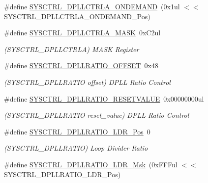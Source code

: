 \begin{DoxyCompactItemize}
\#define \mbox{\hyperlink{group___s_a_m_d21___s_y_s_c_t_r_l_ga69e7047499b6974d553e5ac3e7d472b6}{S\+Y\+S\+C\+T\+R\+L\+\_\+\+D\+P\+L\+L\+C\+T\+R\+L\+A\+\_\+\+O\+N\+D\+E\+M\+A\+ND}}~(0x1ul $<$$<$ S\+Y\+S\+C\+T\+R\+L\+\_\+\+D\+P\+L\+L\+C\+T\+R\+L\+A\+\_\+\+O\+N\+D\+E\+M\+A\+N\+D\+\_\+\+Pos)
\item 
\#define \mbox{\hyperlink{group___s_a_m_d21___s_y_s_c_t_r_l_ga7759bc930961d17fb6a1c8d53d9b4d33}{S\+Y\+S\+C\+T\+R\+L\+\_\+\+D\+P\+L\+L\+C\+T\+R\+L\+A\+\_\+\+M\+A\+SK}}~0x\+C2ul
\begin{DoxyCompactList}\small\item\em (S\+Y\+S\+C\+T\+R\+L\+\_\+\+D\+P\+L\+L\+C\+T\+R\+LA) M\+A\+SK Register \end{DoxyCompactList}\item 
\#define \mbox{\hyperlink{group___s_a_m_d21___s_y_s_c_t_r_l_ga8d2f342a1b224ae5cf0fa357d49c3ed1}{S\+Y\+S\+C\+T\+R\+L\+\_\+\+D\+P\+L\+L\+R\+A\+T\+I\+O\+\_\+\+O\+F\+F\+S\+ET}}~0x48
\begin{DoxyCompactList}\small\item\em (S\+Y\+S\+C\+T\+R\+L\+\_\+\+D\+P\+L\+L\+R\+A\+T\+IO offset) D\+P\+LL Ratio Control \end{DoxyCompactList}\item 
\#define \mbox{\hyperlink{group___s_a_m_d21___s_y_s_c_t_r_l_gaee8c7eb057abe248c8312abfaa82a124}{S\+Y\+S\+C\+T\+R\+L\+\_\+\+D\+P\+L\+L\+R\+A\+T\+I\+O\+\_\+\+R\+E\+S\+E\+T\+V\+A\+L\+UE}}~0x00000000ul
\begin{DoxyCompactList}\small\item\em (S\+Y\+S\+C\+T\+R\+L\+\_\+\+D\+P\+L\+L\+R\+A\+T\+IO reset\+\_\+value) D\+P\+LL Ratio Control \end{DoxyCompactList}\item 
\#define \mbox{\hyperlink{group___s_a_m_d21___s_y_s_c_t_r_l_gab84b0699148696285e95394ae4624f7a}{S\+Y\+S\+C\+T\+R\+L\+\_\+\+D\+P\+L\+L\+R\+A\+T\+I\+O\+\_\+\+L\+D\+R\+\_\+\+Pos}}~0
\begin{DoxyCompactList}\small\item\em (S\+Y\+S\+C\+T\+R\+L\+\_\+\+D\+P\+L\+L\+R\+A\+T\+IO) Loop Divider Ratio \end{DoxyCompactList}\item 
\#define \mbox{\hyperlink{group___s_a_m_d21___s_y_s_c_t_r_l_ga3c5e034ed9b9a16884741f783e1215b4}{S\+Y\+S\+C\+T\+R\+L\+\_\+\+D\+P\+L\+L\+R\+A\+T\+I\+O\+\_\+\+L\+D\+R\+\_\+\+Msk}}~(0x\+F\+F\+Ful $<$$<$ S\+Y\+S\+C\+T\+R\+L\+\_\+\+D\+P\+L\+L\+R\+A\+T\+I\+O\+\_\+\+L\+D\+R\+\_\+\+Pos)
\item 

\end{DoxyCompactItemize}
